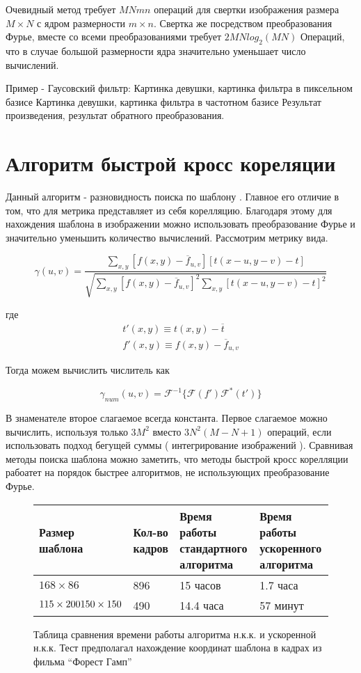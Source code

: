 \documentclass[oneside,final,14pt]{extreport}
\begin{document}
Очевидный метод требует $MNmn$ операций для свертки изображения размера $M\times N$ с ядром размерности $m\times n$. Свертка же посредством преобразования Фурье, вместе со всеми преобразованиями требует $2MNlog_2(MN)$ Операций, что в случае большой размерности ядра значительно уменьшает число вычислений. 

Пример - Гаусовский фильтр:
Картинка девушки, картинка фильтра в пиксельном базисе
Картинка девушки, картинка фильтра в частотном базисе
Результат произведения, результат обратного преобразования.

\section{Алгоритм быстрой  кросс кореляции}
Данный алгоритм  - разновидность поиска по шаблону \cite{Cross-Correlation}. Главное его отличие в том, что для метрика представляет из себя корелляцию. Благодаря этому для нахождения шаблона в изображении можно использовать преобразование Фурье и значительно уменьшить количество вычислений. 
Рассмотрим метрику вида.

\begin{equation}
\gamma(u,v)
=
\frac{
\sum_{x,y}
[f(x,y) - \overline{f}_{u,v}]
[t(x-u,y-v)-t]
}
{
\sqrt{
\sum_{x,y}
[f(x,y) - \overline{f}_{u,v}]^2
\sum_{x,y}
[t(x-u,y-v)-t]^2
}
} 
\end{equation}

где
\begin{gather*}
t'(x,y)
\equiv
t(x,y) - \overline{t}
\\
f'(x,y)
\equiv
f(x,y) - \overline{f}_{u,v}
\end{gather*}

Тогда можем вычислить числитель как

\begin{equation}
\gamma_{num}(u,v)
=
\mathcal{F}^{-1}
\{
\mathcal{F}(f')
\mathcal{F}^*(t')
\}
\end{equation}

В знаменателе второе слагаемое всегда константа. Первое слагаемое можно вычислить, используя только $3M^2$   вместо $3N^2(M-N+1)$ операций, если использовать подход бегущей суммы ( интегрирование изображений ). 
Сравнивая методы поиска шаблона можно заметить, что методы быстрой кросс корелляции рабоатет на порядок быстрее алгоритмов, не использующих преобразование Фурье. 

\begin{figure}

\begin{tabularx}{\textwidth}{|X|X|X|X|}
\hline
Размер шаблона
&
Кол-во кадров
&
Время работы стандартного алгоритма
&
Время работы ускоренного алгоритма
\\
\hline
$168 \times 86$ & 896 & 15 часов & 1.7 часа 
\\
\hline
$	 115\times 200 \newline 150 \times 150 $
 & 490  &14.4 часа & 57 минут 
\\
\hline
\end{tabularx}
\caption{
Таблица сравнения времени работы алгоритма н.к.к.  и ускоренной н.к.к. Тест предполагал нахождение координат шаблона в кадрах из фильма “Форест Гамп”
}
\end{figure}
\end{document}
